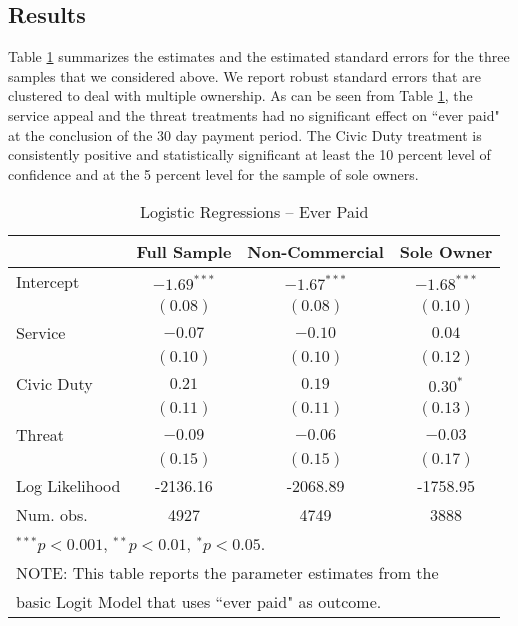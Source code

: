 \documentclass[12pt,titlepage]{article}
\begin{document}
\subsection{Results}
  
Table \ref{XX} summarizes the estimates and the estimated standard
errors for the three samples that we considered above. We report
robust standard errors that are clustered to deal with multiple
ownership. As can be seen from Table \ref{XX}, the service appeal and
the threat treatments had no significant effect on ``ever paid" at the
conclusion of the 30 day payment period.  The Civic Duty treatment is
consistently positive and statistically significant at least the 10
percent level of confidence and at the 5 percent level for the sample
of sole owners.

\begin{table}[htbp]
\caption{Logistic Regressions -- Ever Paid}\label{XX}
\begin{center}
\begin{tabular}{| l |  c | c | c |}
\hline
               & Full Sample & Non-Commercial & Sole Owner \\
\hline
Intercept      & $-1.69^{***}$ & $-1.67^{***}$ & $-1.68^{***}$ \\
               & $(0.08)$      & $(0.08)$      & $(0.10)$      \\
Service          & $-0.07$       & $-0.10$       & $0.04$        \\
               & $(0.10)$      & $(0.10)$      & $(0.12)$      \\
Civic Duty           & $0.21$        & $0.19$        & $0.30^{*}$    \\
               & $(0.11)$      & $(0.11)$      & $(0.13)$      \\
Threat         & $-0.09$       & $-0.06$       & $-0.03$       \\
               & $(0.15)$      & $(0.15)$      & $(0.17)$      \\
\hline
Log Likelihood & -2136.16      & -2068.89      & -1758.95      \\
Num. obs.      & 4927          & 4749          & 3888          \\
\hline
\multicolumn{4}{l}{$^{***}p<0.001$, $^{**}p<0.01$, $^*p<0.05$.} \\
\multicolumn{4}{l}{NOTE: This table reports the parameter estimates from the} \\
\multicolumn{4}{l}{basic Logit Model that uses ``ever paid" as outcome.}
\end{tabular}
\end{center}
\end{table}
\end{document}
